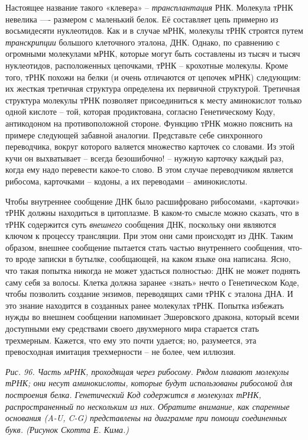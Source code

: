 \documentclass[../main.tex]{subfiles}
\begin{document}
Настоящее название такого «клевера» \--- \emph{трансплантация} РНК\@. Молекула тРНК невелика ---- размером с маленький белок. Её составляет цепь примерно из восьмидесяти нуклеотидов. Как и в случае мРНК, молекулы тРНК строятся путем \emph{транскрипции} большого клеточного эталона, ДНК\@. Однако, по сравнению с огромными молекулами мРНК, которые могут быть составлены из тысяч и тысяч нуклеотидов, расположенных цепочками, тРНК \--- крохотные молекулы. Кроме того, тРНК похожи на белки (и очень отличаются от цепочек мРНК) следующим: их жесткая третичная структура определена их первичной структурой. Третичная структура молекулы тРНК позволяет присоединиться к месту аминокислот только одной кислоте \--- той, которая продиктована, согласно Генетическому Коду, антикодоном на противоположной стороне. Функцию тРНК можно пояснить на примере следующей забавной аналогии. Представьте себе синхронного переводчика, вокруг которого валяется множество карточек со словами. Из этой кучи он выхватывает \--- всегда безошибочно! \--- нужную карточку каждый раз, когда ему надо перевести какое-то слово. В этом случае переводчиком является рибосома, карточками \--- кодоны, а их переводами \--- аминокислоты.

Чтобы внутреннее сообщение ДНК было расшифровано рибосомами, «карточки» тРНК должны находиться в цитоплазме. В каком-то смысле можно сказать, что в тРНК содержится суть \emph{внешнего} сообщения ДНК, поскольку они являются ключом к процессу трансляции. При этом они сами происходят из ДНК\@. Таким образом, внешнее сообщение пытается стать частью внутреннего сообщения, что-то вроде записки в бутылке, сообщающей, на каком языке она написана. Ясно, что такая попытка никогда не может удасться полностью: ДНК не может поднять саму себя за волосы. Клетка должна заранее «знать» нечто о Генетическом Коде, чтобы позволить создание энзимов, переводящих сами тРНК с эталона ДНА. И это знание находится в созданных ранее молекулах тРНК\@. Попытка избежать нужды во внешнем сообщении напоминает Эшеровского дракона, который всеми доступными ему средствами своего двухмерного мира старается стать трехмерным. Кажется, что ему это почти удается; но, разумеется, эта превосходная имитация трехмерности \--- не более, чем иллюзия.

\emph{Рис. 96. Часть мРНК, проходящая через рибосому. Рядом плавают молекулы тРНК; они несут аминокислоты, которые будут использованы рибосомой для построения белка. Генетический Код содержится в молекулах тРНК, распространенный по нескольким из них. Обратите внимание, как спаренные основания (A-U, C-G) представлены на диаграмме при помощи соединенных букв. (Рисунок Скотта Е. Кима.)}
\end{document}
